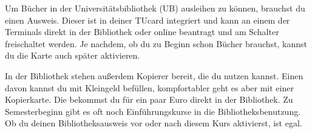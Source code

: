 \begin{multicols}{2}
	Um Bücher in der Universitätsbibliothek (UB) ausleihen zu können, brauchst du einen Ausweis. Dieser ist in deiner TUcard integriert und kann an einem der Terminals direkt in der Bibliothek oder online beantragt und am Schalter freischaltet werden. Je nachdem, ob du zu Beginn schon Bücher brauchst, kannst du die Karte auch später aktivieren.

	In der Bibliothek stehen außerdem Kopierer bereit, die du nutzen kannst. Einen davon kannst du mit Kleingeld befüllen, kompfortabler geht es aber mit einer Kopierkarte. Die bekommst du für ein paar Euro direkt in der Bibliothek. Zu Semesterbeginn gibt es oft noch Einführungskurse in die Bibliotheksbenutzung. Ob du deinen Bibliotheksausweis vor oder nach diesem Kurs aktivierst, ist egal.
	
\end{multicols}
